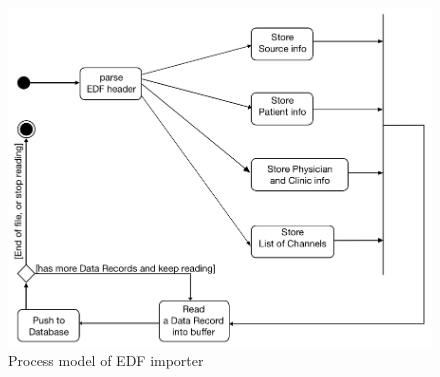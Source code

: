 \begin{figure}
    \centering
    \includegraphics[width=1.0\textwidth]{Figures/EDFImporter.png}
    \caption{Process model of EDF importer}
    \label{fig:Figures/EDFImporter}
\end{figure}
